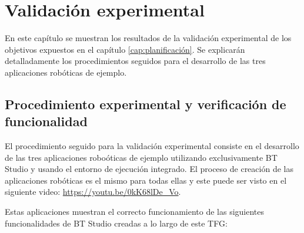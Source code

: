 \chapter{Validación experimental}\label{cap:validacion}

En este capítulo se muestran los resultados de la validación experimental de los objetivos expuestos en el capítulo \ref{cap:planificación}. Se explicarán detalladamente los procedimientos seguidos para el desarrollo de las tres aplicaciones robóticas de ejemplo.

\section{Procedimiento experimental y verificación de funcionalidad}

El procedimiento seguido para la validación experimental consiste en el desarrollo de las tres aplicaciones roboóticas de ejemplo utilizando exclusivamente BT Studio y usando el entorno de ejecución integrado. El proceso de creación de las aplicaciones robóticas es el mismo para todas ellas y este puede ser visto en el siguiente video: \url{https://youtu.be/0kK68lDe_Vo}.

Estas aplicaciones muestran el correcto funcionamiento de las siguientes funcionalidades de BT Studio creadas a lo largo de este TFG:

